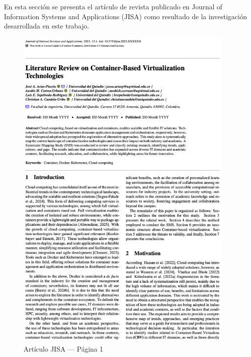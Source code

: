En esta sección se presenta el artículo de revista publicado en Journal of Information Systems and Applications (JISA) como resultado de la investigación desarrollada en este trabajo.

\begin{figure}[H]
    \centering
    \begin{tcolorbox}[
        colback=white,
        colframe=gray!50,
        boxrule=1pt,
        arc=2pt,
        boxsep=5pt,
        left=3pt,
        right=3pt,
        top=3pt,
        bottom=3pt,
        drop shadow
    ]
        \includegraphics[width=0.95\textwidth,keepaspectratio]{apendices/JISA/pagina_1.png}
    \end{tcolorbox}
    \caption{Artículo JISA --- Página 1}\label{fig:jisa-pagina-1}
\end{figure}
\FloatBarrier%
